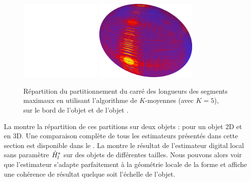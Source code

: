 \begin{figure}[ht]{
  \begin{center}
    \includegraphics[height=4cm]{images/Curvature/Flower_kMeans-5}
    \includegraphics[height=4cm]{images/Curvature/Ellipsoid_Radius_2}
  \end{center}}
  \caption[.]{Répartition du partitionnement du carré des longueurs des segments maximaux en utilisant l'algorithme de $K$-moyennes (avec $K=5$), sur le bord de l'objet \Flower et de l'objet \Ellipsoid
  \label{fig:curvature-pfl-map}.}
\end{figure}

La  montre la répartition de ces partitions sur deux objets : \Flower pour un objet 2D et \Ellipsoid en 3D.
%
Une comparaison complète de tous les estimateurs présentés dans cette section est disponible dans le . La  montre le résultat de l'estimateur digital local sans paramètre $\hat{H}^{*}_{l}$ sur des objets de différentes tailles. Nous pouvons alors voir que l'estimateur s'adapte parfaitement à la géométrie locale de la forme et affiche une cohérence de résultat quelque soit l'échelle de l'objet.

